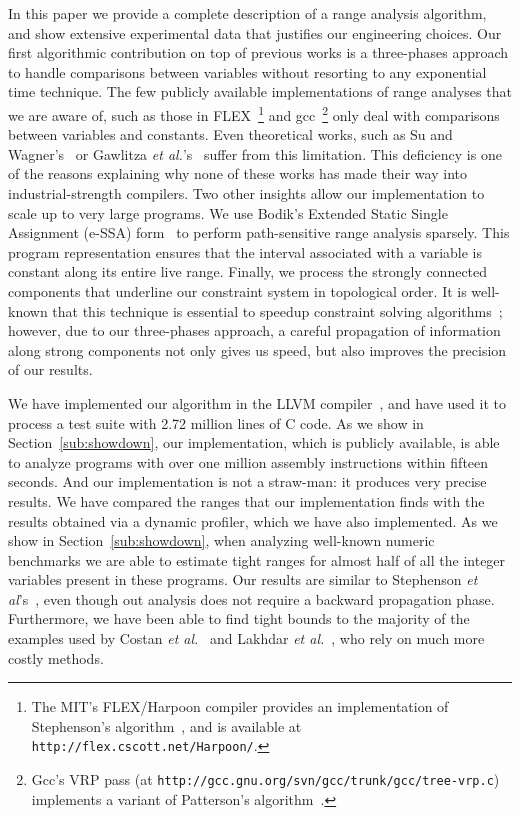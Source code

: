 \documentclass[times]{speauth}
\begin{document}
In this paper we provide a complete description of a range analysis algorithm,
and show extensive experimental data that justifies our engineering choices.
Our first algorithmic contribution on top of previous works is a three-phases
approach to handle comparisons between variables without resorting to any
exponential time technique.
The few publicly available implementations of range analyses that we are
aware of, such as those in FLEX~\footnote{The MIT's FLEX/Harpoon compiler
provides an implementation of Stephenson's algorithm~\cite{Stephenson00}, and
is available at \texttt{http://flex.cscott.net/Harpoon/}.} and
gcc~\footnote{Gcc's VRP pass (at \texttt{http://gcc.gnu.org/svn/gcc/trunk/gcc/tree-vrp.c}) implements a variant of Patterson's
algorithm~\cite{Patterson95}.} only deal with comparisons between variables and
constants.
Even theoretical works, such as Su and Wagner's~\cite{Su05} or Gawlitza
{\em et al.}'s~\cite{Gawlitza09} suffer from this limitation.
This deficiency is one of the reasons explaining why none of these works has
made their way into industrial-strength compilers.
Two other insights allow our implementation to scale up to very large
programs.
We use Bodik's Extended Static Single Assignment (e-SSA) form~\cite{Bodik00} to
perform path-sensitive range analysis sparsely.
This program representation ensures that the interval associated with
a variable is constant along its entire live range.
Finally, we process the strongly connected components that underline our
constraint system in topological order.
It is well-known that this technique is essential to speedup constraint solving
algorithms~\cite[Sec 6.3]{Nielson99}; however, due to our three-phases
approach, a careful propagation of information along strong components not only
gives us speed, but also improves the precision of our results.

We have implemented our algorithm in the LLVM compiler~\cite{Lattner04}, and
have used it to process a test suite with 2.72 million lines of C code.
As we show in Section~\ref{sub:showdown}, our implementation, which is
publicly available, is able to analyze programs with over one million assembly
instructions within fifteen seconds.
And our implementation is not a straw-man: it produces very precise results.
We have compared the ranges that our implementation finds with the results
obtained via a dynamic profiler, which we have also implemented.
As we show in Section~\ref{sub:showdown}, when analyzing well-known numeric
benchmarks we are able to estimate tight ranges for almost half of all the
integer variables present in these programs.
Our results are similar to Stephenson
{\em et al}'s~\cite{Stephenson00}, even though out analysis does not require
a backward propagation phase.
Furthermore, we have been able to find tight bounds to the majority of the
examples used by Costan {\em et al.}~\cite{Costan05} and Lakhdar
{\em et al.}~\cite{Lakhdar11}, who rely on much more costly methods.
\end{document}
